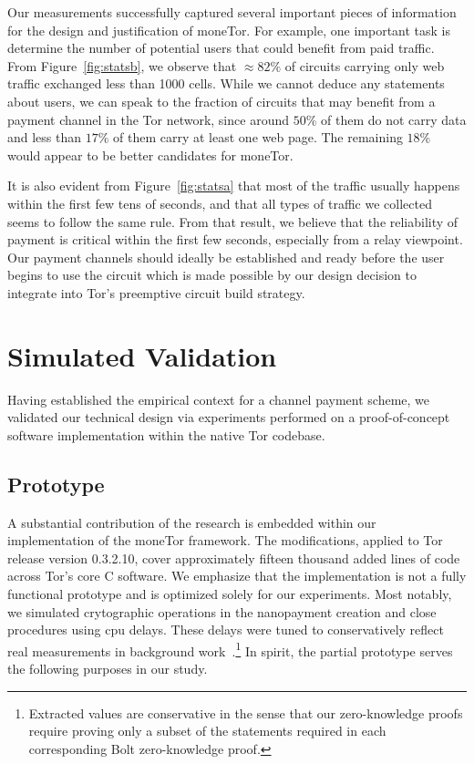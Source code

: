 Our measurements successfully captured several important pieces of information
for the design and justification of moneTor. For example, one important task is
determine the number of potential users that could benefit from paid
traffic. From Figure~\ref{fig:statsb}, we observe that $\approx 82\%$ of
circuits carrying only web traffic exchanged less than 1000 cells. While we
cannot deduce any statements about users, we can speak to the fraction of
circuits that may benefit from a payment channel in the Tor network, since
around $50\%$ of them do not carry data and less than $17\%$ of them carry at
least one web page. The remaining $18\%$ would appear to be better candidates
for moneTor.

It is also evident from Figure~\ref{fig:statsa} that most of the traffic
usually happens within the first few tens of seconds, and that all types of
traffic we collected seems to follow the same rule. From that result, we believe
that the reliability of payment is critical within the first few seconds,
especially from a relay viewpoint. Our payment channels should ideally be
established and ready before the user begins to use the circuit which is made
possible by our design decision to integrate into Tor's preemptive circuit build
strategy.


\section{Simulated Validation}
\label{sec:experimentations}

Having established the empirical context for a channel payment scheme, we
validated our technical design via experiments performed on a proof-of-concept
software implementation within the native Tor codebase.

\subsection{Prototype}

A substantial contribution of the research is embedded within our implementation
of the moneTor framework. The modifications, applied to Tor release version
0.3.2.10, cover approximately fifteen thousand added lines of code across Tor's
core C software. We emphasize that the implementation is not a fully functional
prototype and is optimized solely for our experiments. Most notably, we
simulated crytographic operations in the nanopayment creation and close
procedures using cpu delays. These delays were tuned to conservatively reflect
real measurements in background work~\cite{green2017bolt}.\footnote{Extracted
  values are conservative in the sense that our zero-knowledge proofs require
  proving only a subset of the statements required in each corresponding Bolt
  zero-knowledge proof.}  In spirit, the partial prototype serves the following
purposes in our study.

